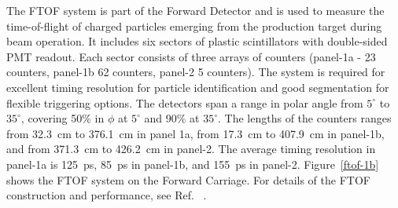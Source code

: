 \documentclass[final,3p,twocolumn]{elsarticle}
\begin{document}
The FTOF system is part of the Forward Detector and is used to measure the time-of-flight of charged particles 
emerging from the production target during beam operation. It includes six sectors of plastic scintillators with 
double-sided PMT readout. Each sector consists of three arrays of counters (panel-1a - 23 counters, panel-1b 62
counters, panel-2 5 counters). The system is required for excellent timing resolution for particle identification and
good segmentation for flexible triggering options. The detectors span a range in polar angle from $5^\circ$ to
$35^\circ$, covering 50\% in $\phi$ at $5^\circ$ and 90\% at $35^\circ$. The lengths of the counters ranges from
32.3~cm to 376.1~cm in panel 1a, from 17.3~cm to 407.9~cm in panel-1b, and from 371.3~cm to 426.2~cm in panel-2.
The average timing resolution in panel-1a is 125~ps, 85~ps in panel-1b, and 155~ps in panel-2. Figure~\ref{ftof-1b}
shows the FTOF system on the Forward Carriage. For details of the FTOF construction and performance, see
Ref. ~\cite{FTOF}. 
\end{document}
